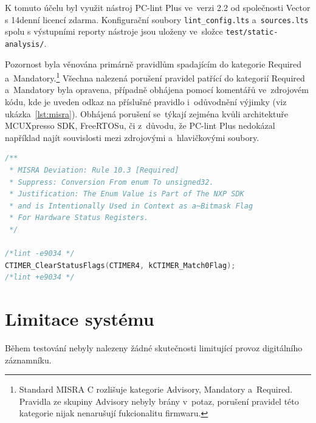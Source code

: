 K tomuto účelu byl využit nástroj PC-lint Plus ve~verzi 2.2 od společnosti Vector s 14denní licencí zdarma. Konfigurační soubory \texttt{lint\_config.lts} a~\texttt{sources.lts} spolu s výstupními reporty nástroje jsou uloženy ve~složce \texttt{test/static-analysis/}.

Pozornost byla věnována primárně pravidlům spadajícím do kategorie Required a~Mandatory.\footnote{Standard MISRA C rozlišuje kategorie Advisory, Mandatory a~Required. Pravidla ze skupiny Advisory nebyly brány v~potaz, porušení pravidel této kategorie nijak nenarušují fukcionalitu firmwaru.} Všechna nalezená porušení pravidel patřící do kategorií Required a~Mandatory byla opravena, případně obhájena pomocí komentářů ve~zdrojovém kódu, kde je uveden odkaz na příslušné pravidlo i~odůvodnění výjimky (viz ukázka~\ref{lst:misra}). Obhájená porušení se~týkají zejména kvůli architektuře MCUXpresso SDK, FreeRTOSu, či z~důvodu, že PC-lint Plus nedokázal například najít souvislosti mezi zdrojovými a~hlavičkovými soubory.

\newpage

\begin{lstlisting}[language=C, caption={Ukázka odůvodněného porušení pravidla MISRA}, label={lst:misra}]
/**
 * MISRA Deviation: Rule 10.3 [Required]
 * Suppress: Conversion From enum To unsigned32.
 * Justification: The Enum Value is Part of The NXP SDK
 * and is Intentionally Used in Context as a~Bitmask Flag 
 * For Hardware Status Registers.
 */

/*lint -e9034 */
CTIMER_ClearStatusFlags(CTIMER4, kCTIMER_Match0Flag);
/*lint +e9034 */
\end{lstlisting}


\section{Limitace systému}
\label{limitace}
Během testování nebyly nalezeny žádné skutečnosti limitující provoz digitálního záznamníku.



